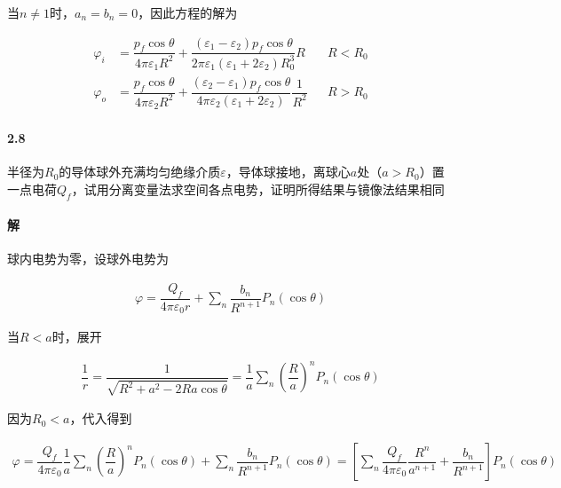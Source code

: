 \documentclass{article}
\begin{document}
当$n \neq 1$时，$a_n = b_n = 0$，因此方程的解为

\begin{equation*}
  \begin{aligned}
    \varphi_i &= \dfrac{p_f \cos \theta}{4\pi \varepsilon_1 R^2} + \dfrac{\left( \varepsilon_1 - \varepsilon_2 \right) p_f \cos \theta}{2\pi \varepsilon_1 \left( \varepsilon_1 + 2 \varepsilon_2 \right) R_0^3} R  && R < R_0 \\
    \varphi_o &= \dfrac{p_f \cos \theta}{4\pi \varepsilon_2 R^2} + \dfrac{\left( \varepsilon_2 - \varepsilon_1 \right) p_f \cos \theta}{4\pi \varepsilon_2 \left( \varepsilon_1 + 2\varepsilon_2 \right)} \dfrac{1}{R^2}  && R > R_0 
  \end{aligned}
\end{equation*}

\paragraph{2.8}

半径为$R_0$的导体球外充满均匀绝缘介质$\varepsilon$，导体球接地，离球心$a$处（$a>R_0$）置一点电荷$Q_f$，试用分离变量法求空间各点电势，证明所得结果与镜像法结果相同

\paragraph{解}

球内电势为零，设球外电势为

\begin{equation*}
  \begin{aligned}
    \varphi = \dfrac{Q_f}{4 \pi \varepsilon_0 r} + \sum_n \dfrac{b_n}{R^{n+1}} P_n \left( \cos \theta \right)  
  \end{aligned}
\end{equation*}

当$R<a$时，展开

\begin{equation*}
  \begin{aligned}
    \dfrac{1}{r} = \dfrac{1}{\sqrt{R^2 + a^2 - 2 R a \cos \theta}}
    = \dfrac{1}{a} \sum _n \left( \dfrac{R}{a}  \right)^n P_n \left( \cos \theta \right) 
  \end{aligned}
\end{equation*}

因为$R_0 < a$，代入得到

\begin{equation*}
  \begin{aligned}
    \varphi = \dfrac{Q_f}{4 \pi \varepsilon_0} \dfrac{1}{a} \sum _n \left( \dfrac{R}{a}  \right)^n P_n \left( \cos \theta \right) + \sum_n \dfrac{b_n}{R^{n+1}} P_n \left( \cos \theta \right)
    = \left[ \sum _n \dfrac{Q_f}{4 \pi \varepsilon_0} \dfrac{R^n}{a^{n+1}} + \dfrac{b_n}{R^{n+1}} \right] P_n \left( \cos \theta \right)
  \end{aligned}
\end{equation*}
\end{document}
